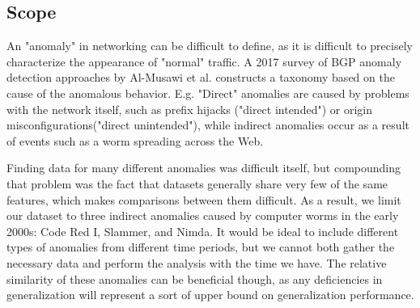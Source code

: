 \subsection{Scope}

An "anomaly" in networking can be difficult to define, as it is difficult to precisely characterize the appearance of "normal" traffic. A 2017 survey of BGP anomaly detection approaches by Al-Musawi et al. \cite{al2016bgp} constructs a taxonomy based on the cause of the anomalous behavior. E.g. "Direct" anomalies are caused by problems with the network itself, such as prefix hijacks ("direct intended") or origin misconfigurations("direct unintended"), while indirect anomalies occur as a result of events such as a worm spreading across the Web. 

Finding data for many different anomalies was difficult itself, but compounding that problem was the fact that datasets generally share very few of the same features, which makes comparisons between them difficult. As a result, we limit our dataset to three indirect anomalies caused by computer worms in the early 2000s: Code Red I, Slammer, and Nimda. It would be ideal to include different types of anomalies from different time periods, but we cannot both gather the necessary data and perform the analysis with the time we have. The relative similarity of these anomalies can be beneficial though, as any deficiencies in generalization will represent a sort of upper bound on generalization performance. 
